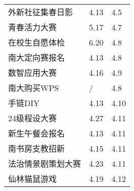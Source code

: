 \documentclass[letterpaper, 12pt]{article}
\begin{document}
\begin{multicols}{2}
{\begin{longtable}{|>{\centering\arraybackslash}m{}|m{}|m{}|}
    外新社征集春日影 & 4.13 & 4.5\\
    青春活力大赛 & 5.17 & 4.7\\
    在校生自愿体检 & 6.20 & 4.8\\
    南大定向赛报名 & 4.13 & 4.8\\
    数智应用大赛 & 4.16 & 4.9\\
    南大购买WPS & / & 4.8\\
    手链DIY & 4.13 & 4.10\\
    24级程设大赛 & 4.27 & 4.11\\
    新生午餐会报名 & 4.13 & 4.11\\
    南书房支教招新 & 4.15 & 4.11\\
    法治情景剧策划大赛 & 4.23 & 4.11\\
    仙林猫鼠游戏 & 4.19 & 4.12\\
    \hline
\end{longtable}
\unskip
\unpenalty
\unpenalty}\unvbox\colbbox
\end{multicols}
\end{document}
